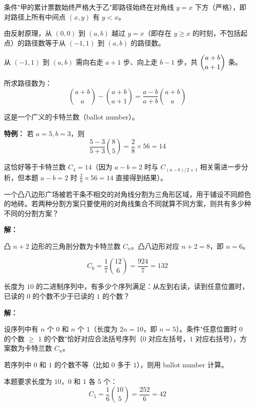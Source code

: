 \documentclass[12pt, a4paper]{ctexart}
\begin{document}
条件"甲的累计票数始终严格大于乙"即路径始终在对角线 \(y=x\) 下方（严格），即对路径上所有中间点 \((x,y)\) 有 \(y < x\)。

由反射原理，从 \((0,0)\) 到 \((a,b)\) 越过 \(y=x\)（即存在 \(y \ge x\) 的时刻，不包括起点）的路径数等于从 \((-1,1)\) 到 \((a,b)\) 的路径数。

从 \((-1,1)\) 到 \((a,b)\) 需向右走 \(a+1\) 步、向上走 \(b-1\) 步，共 \(\dbinom{a+b}{a+1}\) 条。

所求路径数为：
\[
\binom{a+b}{a} - \binom{a+b}{a+1} = \frac{a-b}{a+b}\binom{a+b}{a}
\]

这是一个广义的卡特兰数（ballot number）。

\textbf{特例：} 若 \(a=5, b=3\)，则
\[
\frac{5-3}{5+3}\binom{8}{5} = \frac{2}{8}\times 56 = \boxed{14}
\]

这恰好等于卡特兰数 \(C_4 = 14\)（因为 \(a-b=2\) 时与 \(C_{(a-b)/2+1}\) 相关需进一步分析，但本题 \(a-b=2\) 时 \(\frac{2}{8}\times 56 = 14\) 直接得到结果）。

\vspace{6pt}

\begin{appbox}[【应用3】几何中的三角剖分]
一个凸八边形广场被若干条不相交的对角线分割为三角形区域，用于铺设不同颜色的地砖。若两种分割方案只要使用的对角线集合不同就算不同方案，则共有多少种不同的分割方案？
\end{appbox}

\textbf{解：}

凸 \(n+2\) 边形的三角剖分数为卡特兰数 \(C_n\)。凸八边形对应 \(n+2=8\)，即 \(n=6\)。

\[
C_6 = \frac{1}{7}\binom{12}{6} = \frac{924}{7} = \boxed{132}
\]

\vspace{6pt}

\begin{appbox}
长度为 \(10\) 的二进制序列中，有多少个序列满足：从左到右读，读到任意位置时，已读的 \(0\) 的个数不少于已读的 \(1\) 的个数？
\end{appbox}

\textbf{解：}

设序列中有 \(n\) 个 \(0\) 和 \(n\) 个 \(1\)（长度为 \(2n=10\)，即 \(n=5\)）。条件"任意位置时 \(0\) 的个数 \(\ge\) \(1\) 的个数"恰好对应合法括号序列（\(0\) 对应左括号，\(1\) 对应右括号），方案数为卡特兰数 \(C_n\)。

若序列中 \(0\) 和 \(1\) 的个数不等（比如 \(0\) 多于 \(1\)），则用 ballot number 计算。

本题要求长度为 \(10\)，\(0\) 和 \(1\) 各 \(5\) 个：
\[
C_5 = \frac{1}{6}\binom{10}{5} = \frac{252}{6} = \boxed{42}
\]
\end{document}
